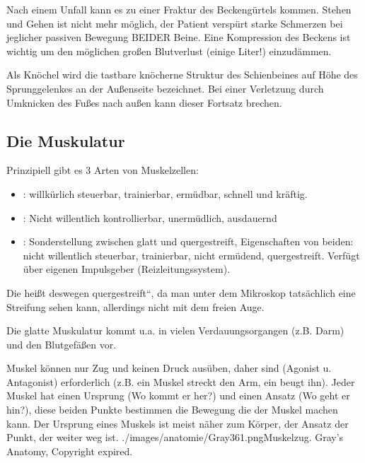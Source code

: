 Nach einem Unfall kann es zu einer Fraktur des Beckengürtels kommen. Stehen und
Gehen ist nicht mehr möglich, der Patient verspürt starke Schmerzen bei
jeglicher passiven Bewegung BEIDER Beine. Eine Kompression des Beckens ist
wichtig um den möglichen großen Blutverlust (einige Liter!) einzudämmen.

Als Knöchel wird die tastbare knöcherne Struktur des Schienbeines auf Höhe des
Sprunggelenkes an der Außenseite bezeichnet. Bei einer Verletzung durch
Umknicken des Fußes nach außen kann dieser Fortsatz brechen.

 

\subsection{Die Muskulatur}
    

Prinzipiell gibt es 3  Arten von Muskelzellen:

\begin{itemize}
    \item {}:
    willkürlich steuerbar, trainierbar, er\-müd\-bar,  schnell und
    kräftig.     
    \item {}: Nicht willentlich
    kontrollierbar, unermüdlich, ausdauernd
    \item {}: Sonderstellung zwischen glatt und
    quergestreift, Eigenschaften von beiden: nicht willentlich
    steuerbar, trainierbar, nicht ermüdend, quergestreift.
    Verfügt über eigenen Impulsgeber (Reizleitungssystem).
\end{itemize}

Die  heißt deswegen
{\quotedblbase}quergestreift{\textquotedblleft}, da man unter dem
Mikroskop tatsächlich eine Streifung sehen kann, allerdings nicht mit
dem freien Auge. 

Die glatte Muskulatur kommt u.a. in vielen
Verdauungsorgangen (z.B. Darm) und den Blutgefäßen vor.

{
Muskel können nur Zug und keinen
Druck ausüben, daher sind  (Agonist u.
Antagonist) erforderlich (z.B. ein Muskel streckt den Arm,
ein  beugt ihn). Jeder Muskel hat einen Ursprung (Wo kommt er her?)
und einen Ansatz (Wo geht er hin?), diese beiden Punkte bestimmen die Bewegung
die der Muskel machen kann. Der Ursprung eines Muskels ist meist näher zum
Körper, der Ansatz der Punkt, der weiter weg ist.} {}
{./images/anatomie/Gray361.png}{\gAuthNotesPicLegalOk{}{}Muskelzug. }{Gray's
Anatomy, Copyright expired.}






